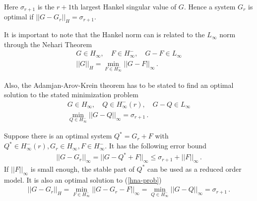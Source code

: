Here \(\sigma_{r+1}\) is the \(r+1\)th largest Hankel singular value of \(G\).
Hence a system \(G_r\) is optimal if \(||G - G_r||_H = \sigma_{r+1}\).

It is important to note that the Hankel norm can is related to the \(L_{\infty}\) norm through the Nehari Theorem
\begin{gather}
G \in H_{\infty}, \quad F \in H_{\infty}^-, \quad G - F \in L_{\infty} \\
||G||_H = \min_{F \in H^{-}_{\infty}} ||G - F||_{\infty} \,.
\end{gather}

Also, the Adamjan-Arov-Krein theorem has to be stated to find an optimal solution to the stated minimization problem
\begin{gather}
G \in H_{\infty}, \quad Q \in H_{\infty}^-(r), \quad G - Q \in L_{\infty} \\
\min_{Q \in H_{\infty}^{-}} ||G-Q||_{\infty} = \sigma_{r+1} \,.
\end{gather}

Suppose there is an optimal system \(Q^{*} = G_r + F\) with \(Q^{*}  \in H_{\infty}^-(r), G_r \in H_{\infty}, F \in H_{\infty}^-\).
It has the following error bound
\begin{gather}
||G - G_r||_{\infty} = ||G - Q^{*} + F||_{\infty} \leq \sigma_{r+1} + ||F||_{\infty}\,. \label{fmin}
\end{gather}
If \(||F||_{\infty}\) is small enough, the stable part of \(Q^{*}\) can be used as a reduced order model.
It is also an optimal solution to (\ref{hna-prob}) 
\cite{sandberg}
\begin{gather}
||G - G_r||_H = \min_{F \in H^{-}_{\infty}} ||G - G_r - F||_{\infty} = \min_{Q \in H_{\infty}^{-}} ||G-Q||_{\infty} = \sigma_{r+1} \,.
\end{gather}


